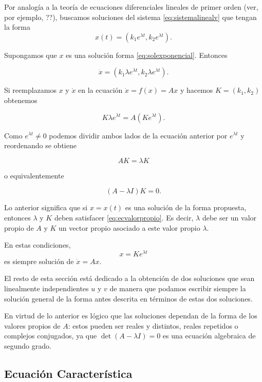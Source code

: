 \documentclass[11pt]{book}
\theoremstyle{definition}
\numberwithin{definition}{section}
\theoremstyle{theorem}
\numberwithin{theorem}{section}
\numberwithin{lemma}{section}
\numberwithin{corollary}{section}
\theoremstyle{plain}
\numberwithin{example}{section}
\begin{document}
Por analogía a la teoría de ecuaciones diferenciales lineales de primer orden (ver, por ejemplo, ??), buscamos soluciones del sistema \ref{eq:sistemalinealv} que tengan la forma
\begin{equation} \label{eq:solexponencial}
x(t) = (k_1e^{\lambda t}, k_2e^{\lambda t}).
\end{equation}

Supongamos que $x$ es una solución forma \ref{eq:solexponencial}. Entonces

$$ \dot{x} = (k_1 \lambda e^{\lambda t}, k_2 \lambda e^{\lambda t}). $$

Si reemplazamos $x$ y $\dot{x}$ en la ecuación $\dot{x} = f(x) = Ax$ y hacemos $K = (k_1, k_2)$ obtenemos

$$
	K \lambda e^{\lambda t} = A (Ke^{\lambda t}).
$$

Como $e^{\lambda t} \neq 0$ podemos dividir ambos lados de la ecuación anterior por $e^{\lambda t}$ y reordenando se obtiene

$$ AK = \lambda K$$

o equivalentemente

\begin{equation} \label{eq:ecvalorpropio}
	(A - \lambda I) K = 0.
\end{equation}

Lo anterior significa que si $x = x(t)$ es una solución de la forma propuesta, entonces $\lambda$ y $K$ deben satisfacer \ref{eq:ecvalorpropio}. Es decir, $\lambda$ debe ser un valor propio de $A$ y $K$ un vector propio asociado a este valor propio $\lambda$.

En estas condiciones, $$ x = K e^{\lambda t}$$ es siempre solución de $\dot{x} = Ax$.

El resto de esta sección está dedicado a la obtención de dos soluciones que sean linealmente independientes $u$ y $v$ de manera que podamos escribir siempre la solución general de la forma antes descrita en términos de estas dos soluciones.

En virtud de lo anterior es lógico que las soluciones dependan de la forma de los valores propios de $A$: estos pueden ser reales y distintos, reales repetidos o complejos conjugados, ya que $\det(A - \lambda I) = 0$ es una ecuación algebraica de segundo grado.

\subsection{Ecuación Característica}
\end{document}
